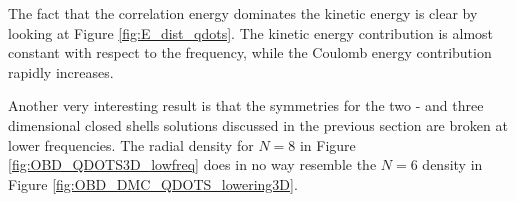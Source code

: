 The fact that the correlation energy dominates the kinetic energy is clear by looking at Figure \ref{fig:E_dist_qdots}. The kinetic energy contribution is almost constant with respect to the frequency, while the Coulomb energy contribution rapidly increases.

Another very interesting result is that the symmetries for the two - and three dimensional closed shells solutions discussed in the previous section are broken at lower frequencies. The radial density for $N=8$ in Figure \ref{fig:OBD_QDOTS3D_lowfreq} does in no way resemble the $N=6$ density in Figure \ref{fig:OBD_DMC_QDOTS_lowering3D}.

\newcommand{\qqq}{\qquad\qquad\qquad}
\newcommand{\qq}{\qquad\qquad}
\newcommand{\rot}[1]{\begin{sideways}#1\end{sideways}}
\setlength{\tabcolsep}{0.1pt}
